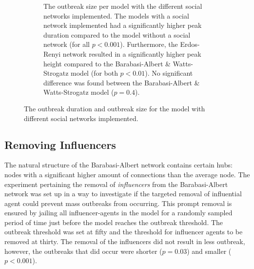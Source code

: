 \documentclass[10pt]{article}
\begin{document}
\begin{figure}[h!]
\begin{subfigure}[b]{.45\linewidth}
            \caption{The outbreak size per model with the different social networks implemented. The models with a social network implemented had a significantly higher peak duration compared to the model without a social network (for all $p < 0.001$). Furthermore, the Erdos-Renyi network resulted in a significantly higher peak height compared to the Barabasi-Albert \& Watts-Strogatz model (for both $p < 0.01$). No significant difference was found between the Barabasi-Albert \& Watts-Strogatz model ($p = 0.4$). }
            \label{fig:size}
        \end{subfigure}
        \captionsetup{width=0.9\linewidth}
        \caption{The outbreak duration and outbreak size for the model with different social networks implemented.}
        \label{fig:results}
    \end{figure}

    \subsection{Removing Influencers}
    The natural structure of the Barabasi-Albert network contains certain hubs: nodes with a significant higher amount of connections than the average node. The experiment pertaining the removal of \textit{influencers} from the Barabasi-Albert network was set up in a way to investigate if the targeted removal of influential agent could prevent mass outbreaks from occurring. This prompt removal is ensured by jailing all influencer-agents in the model for a randomly sampled period of time just before the model reaches the outbreak threshold. The outbreak threshold was set at fifty and the threshold for influencer agents to be removed at thirty. The removal of the influencers did not result in less outbreak, however, the outbreaks that did occur were shorter  ($p = 0.03$) and smaller ($p < 0.001$). %
\end{document}

